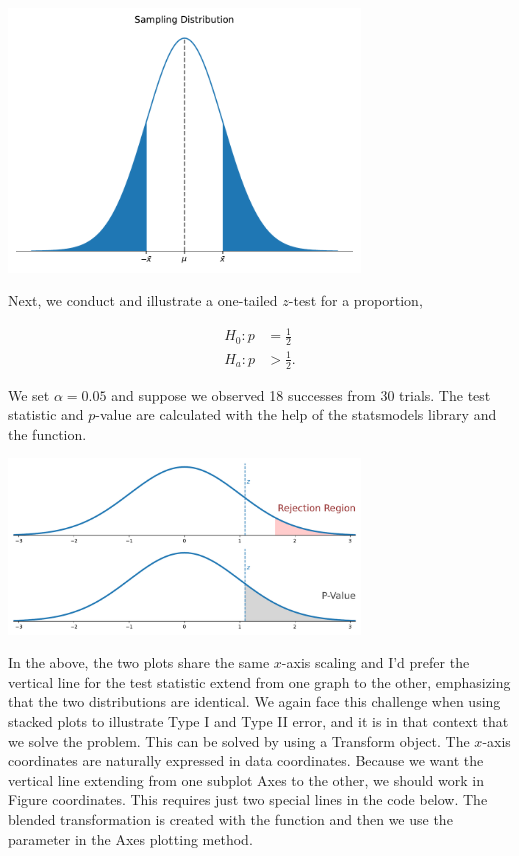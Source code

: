 \begin{center}
    \includegraphics[width = 0.7\textwidth]{figures/specialplots/sampling-dist.pdf}
\end{center}



Next, we conduct and illustrate a one-tailed $z$-test for a proportion,

\begin{align*}
H_0:  p & = \frac{1}{2} \\
H_a:  p & > \frac{1}{2}.
\end{align*}

We set $\alpha = 0.05$ and suppose we observed 18 successes from 30 trials. The test statistic and $p$-value are calculated with the help of the statsmodels library and the  function. 



\begin{center}
    \includegraphics[width = 0.7\textwidth]{figures/specialplots/one-tail-norm.pdf}
\end{center}

In the above, the two plots share the same $x$-axis scaling and I'd prefer the vertical line for the test statistic extend from one graph to the other, emphasizing that the two distributions are identical. We again face this challenge when using stacked plots to illustrate Type I and Type II error, and it is in that context that we solve the problem. This can be solved by using a Transform object. The $x$-axis coordinates are naturally expressed in data coordinates. Because we want the vertical line extending from one subplot Axes to the other, we should work in Figure coordinates. This requires just two special lines in the code below. The blended transformation is created with the  function and then we use the  parameter in the Axes plotting method. 


